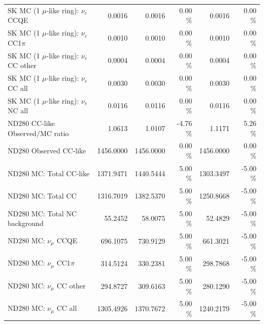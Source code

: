 \begin{table}
\begin{tabular}{| l | r | r  r | r  r |}
                             SK MC (1 $\mu$-like ring): $\nu_{e}$ CCQE &          0.0016 &          0.0016 &  0.00 \%  &          0.0016 &  0.00 \%  \\ 
                         SK MC (1 $\mu$-like ring): $\nu_{e}$ CC1$\pi$ &          0.0010 &          0.0010 &  0.00 \%  &          0.0010 &  0.00 \%  \\ 
                         SK MC (1 $\mu$-like ring): $\nu_{e}$ CC other &          0.0004 &          0.0004 &  0.00 \%  &          0.0004 &  0.00 \%  \\ 
                           SK MC (1 $\mu$-like ring): $\nu_{e}$ CC all &          0.0030 &          0.0030 &  0.00 \%  &          0.0030 &  0.00 \%  \\ 
                           SK MC (1 $\mu$-like ring): $\nu_{e}$ NC all &          0.0116 &          0.0116 &  0.00 \%  &          0.0116 &  0.00 \%  \\ 
\hline
                                       ND280 CC-like Observed/MC ratio &          1.0613 &          1.0107 & -4.76 \%  &          1.1171 &  5.26 \%  \\ 
                                                ND280 Observed CC-like &       1456.0000 &       1456.0000 &  0.00 \%  &       1456.0000 &  0.00 \%  \\ 
                                               ND280 MC: Total CC-like &       1371.9471 &       1440.5444 &  5.00 \%  &       1303.3497 & -5.00 \%  \\ 
                                                    ND280 MC: Total CC &       1316.7019 &       1382.5370 &  5.00 \%  &       1250.8668 & -5.00 \%  \\ 
                                         ND280 MC: Total NC background &         55.2452 &         58.0075 &  5.00 \%  &         52.4829 & -5.00 \%  \\ 
\hline
                                            ND280 MC: $\nu_{\mu}$ CCQE &        696.1075 &        730.9129 &  5.00 \%  &        661.3021 & -5.00 \%  \\ 
                                        ND280 MC: $\nu_{\mu}$ CC1$\pi$ &        314.5124 &        330.2381 &  5.00 \%  &        298.7868 & -5.00 \%  \\ 
                                        ND280 MC: $\nu_{\mu}$ CC other &        294.8727 &        309.6163 &  5.00 \%  &        280.1290 & -5.00 \%  \\ 
                                          ND280 MC: $\nu_{\mu}$ CC all &       1305.4926 &       1370.7672 &  5.00 \%  &       1240.2179 & -5.00 \%  \\ 

\end{tabular}
\end{table}
